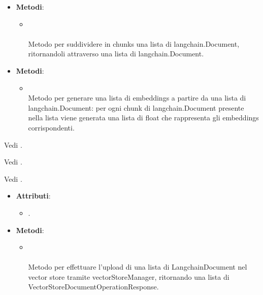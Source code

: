 \documentclass[10pt, a4paper]{article}
\begin{document}
\label{ChunkerizerDettaglio}
\begin{itemize}
    \item \textbf{Metodi}:
    \begin{itemize}
        \item {}\\ \\
        Metodo per suddividere in chunks una lista di langchain.Document, ritornandoli attraverso una lista di langchain.Document.
    \end{itemize}
\end{itemize}

\label{EmbeddingsCreatorDettaglio}
\begin{itemize}
    \item \textbf{Metodi}:
    \begin{itemize}
        \item {}\\
        Metodo per generare una lista di embeddings a partire da una lista di langchain.Document: per ogni chunk di langchain.Document presente nella lista viene generata una lista di float che rappresenta gli embeddings corrispondenti.
    \end{itemize}
\end{itemize}

Vedi .

Vedi .

Vedi .

\label{EmbeddingsUploaderVectorStoreDettaglio}
\begin{itemize}
    \item \textbf{Attributi}:
    \begin{itemize}
        \item {}.
    \end{itemize}
    \item \textbf{Metodi}:
    \begin{itemize}
        \item {}\\\\
        Metodo per effettuare l'upload di una lista di LangchainDocument nel vector store tramite vectorStoreManager, ritornando una lista di VectorStoreDocumentOperationResponse.
    \end{itemize}
\end{itemize}
\end{document}
